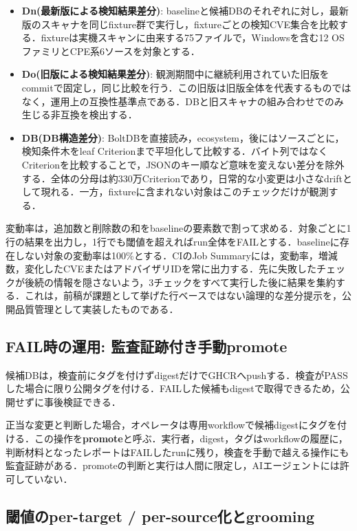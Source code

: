 \documentclass{css}
\begin{document}
\begin{itemize}
\item \textbf{Dn(最新版による検知結果差分)}: baselineと候補DBのそれぞれに対し，最新版のスキャナを同じfixture群で実行し，fixtureごとの検知CVE集合を比較する．fixtureは実機スキャンに由来する75ファイルで，Windowsを含む12 OSファミリとCPE系6ソースを対象とする．
\item \textbf{Do(旧版による検知結果差分)}: 観測期間中に継続利用されていた旧版をcommitで固定し，同じ比較を行う．この旧版は旧版全体を代表するものではなく，運用上の互換性基準点である．DBと旧スキャナの組み合わせでのみ生じる非互換を検出する．
\item \textbf{DB(DB構造差分)}: BoltDBを直接読み，ecosystem，後にはソースごとに，検知条件木をleaf Criterionまで平坦化して比較する．バイト列ではなくCriterionを比較することで，JSONのキー順など意味を変えない差分を除外する．全体の分母は約330万Criterionであり，日常的な小変更は小さなdriftとして現れる．一方，fixtureに含まれない対象はこのチェックだけが観測する．
\end{itemize}

変動率は，追加数と削除数の和をbaselineの要素数で割って求める．対象ごとに1行の結果を出力し，1行でも閾値を超えればrun全体をFAILとする．baselineに存在しない対象の変動率は100\%とする．CIのJob Summaryには，変動率，増減数，変化したCVEまたはアドバイザリIDを常に出力する．先に失敗したチェックが後続の情報を隠さないよう，3チェックをすべて実行した後に結果を集約する．これは，前稿が課題として挙げた行ベースではない論理的な差分提示\cite{nakaoka2025}を，公開品質管理として実装したものである．

\subsection{FAIL時の運用: 監査証跡付き手動promote}
\label{sec:promote}

候補DBは，検査前にタグを付けずdigestだけでGHCRへpushする．検査がPASSした場合に限り公開タグを付ける．FAILした候補もdigestで取得できるため，公開せずに事後検証できる．

正当な変更と判断した場合，オペレータは専用workflowで候補digestにタグを付ける．この操作を\textbf{promote}と呼ぶ．実行者，digest，タグはworkflowの履歴に，判断材料となったレポートはFAILしたrunに残り，検査を手動で越える操作にも監査証跡がある．promoteの判断と実行は人間に限定し，AIエージェントには許可していない．

\subsection{閾値のper-target / per-source化とgrooming}
\label{sec:threshold}
\end{document}
